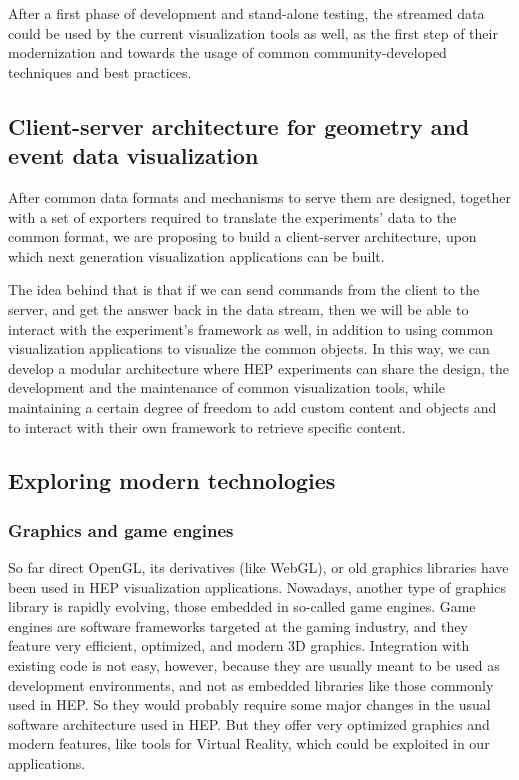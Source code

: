 \documentclass[12pt,a4paper]{article}
\begin{document}
After a first phase of development and stand-alone testing, the streamed data could be used by the current visualization tools as well,
as the first step of their modernization and towards the usage of common community-developed techniques and best practices.

\hypertarget{client-server}{%
\subsection{Client-server architecture for geometry and event data visualization}\label{client-server}}

After common data formats and mechanisms to serve them are designed, together with a set of exporters required to translate the experiments’
data to the common format, we are proposing to build a client-server architecture, upon which next generation visualization applications can be built.

The idea behind that is that if we can send commands from the client to the server, and get the answer back in the data stream, then
we will be able to interact with the experiment’s framework as well, in addition to using common visualization applications to visualize
the common objects. In this way, we can develop a modular architecture where HEP experiments can share the design, the
development and the maintenance of common visualization tools, while maintaining a certain degree of freedom to add custom content
and objects and to interact with their own framework to retrieve specific content.

\hypertarget{modern-tech}{%
\subsection{Exploring modern technologies}\label{modern-tech}}

\hypertarget{graphic-engines}{%
\subsubsection{Graphics and game engines}\label{graphic-engines}}

So far direct OpenGL, its derivatives (like WebGL), or old graphics libraries have been used in HEP visualization applications. Nowadays,
another type of graphics library is rapidly evolving, those embedded in so-called game engines. Game engines are software frameworks targeted
at the gaming industry, and they feature very efficient, optimized, and modern 3D graphics.
Integration with existing code is not easy, however, because they are usually meant to be used as development environments,
and not as embedded libraries like those commonly used in HEP. So they would probably require some major changes in the usual
software architecture used in HEP. But they offer very optimized graphics and modern features, like tools for Virtual Reality,
which could be exploited in our applications.
\end{document}
